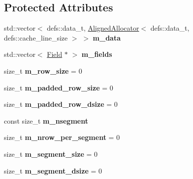 \subsection*{Protected Attributes}
\begin{DoxyCompactItemize}
\item 
std\+::vector$<$ defs\+::data\+\_\+t, \hyperlink{classAlignedAllocator}{Aligned\+Allocator}$<$ defs\+::data\+\_\+t, defs\+::cache\+\_\+line\+\_\+size $>$ $>$ {\bfseries m\+\_\+data}\hypertarget{classTable_ac53b53b44f038757f4ff525f1c40af29}{}\label{classTable_ac53b53b44f038757f4ff525f1c40af29}

\item 
std\+::vector$<$ \hyperlink{classField}{Field} $\ast$ $>$ {\bfseries m\+\_\+fields}\hypertarget{classTable_a34c933ab7a70f8993497ca038b9cf07d}{}\label{classTable_a34c933ab7a70f8993497ca038b9cf07d}

\item 
size\+\_\+t {\bfseries m\+\_\+row\+\_\+size} = 0\hypertarget{classTable_aeced958ceec106a4f1363626f591a3a7}{}\label{classTable_aeced958ceec106a4f1363626f591a3a7}

\item 
size\+\_\+t {\bfseries m\+\_\+padded\+\_\+row\+\_\+size} = 0\hypertarget{classTable_a36ec3e1ff200630605d6089d558e2e70}{}\label{classTable_a36ec3e1ff200630605d6089d558e2e70}

\item 
size\+\_\+t {\bfseries m\+\_\+padded\+\_\+row\+\_\+dsize} = 0\hypertarget{classTable_a1ad9d14adc0644eded9e1d0a6bc26172}{}\label{classTable_a1ad9d14adc0644eded9e1d0a6bc26172}

\item 
const size\+\_\+t {\bfseries m\+\_\+nsegment}\hypertarget{classTable_a461b749bf81e9ada2ff2556038d466a3}{}\label{classTable_a461b749bf81e9ada2ff2556038d466a3}

\item 
size\+\_\+t {\bfseries m\+\_\+nrow\+\_\+per\+\_\+segment} = 0\hypertarget{classTable_a4de9366dc6dfd1ed4460e1ab1a4ca234}{}\label{classTable_a4de9366dc6dfd1ed4460e1ab1a4ca234}

\item 
size\+\_\+t {\bfseries m\+\_\+segment\+\_\+size} = 0\hypertarget{classTable_a68ee298859ca4c2970322c9ba8941a80}{}\label{classTable_a68ee298859ca4c2970322c9ba8941a80}

\item 
size\+\_\+t {\bfseries m\+\_\+segment\+\_\+dsize} = 0\hypertarget{classTable_a3ddcc771a935fe76cde1e8ec334c3e30}{}\label{classTable_a3ddcc771a935fe76cde1e8ec334c3e30}


\end{DoxyCompactItemize}
